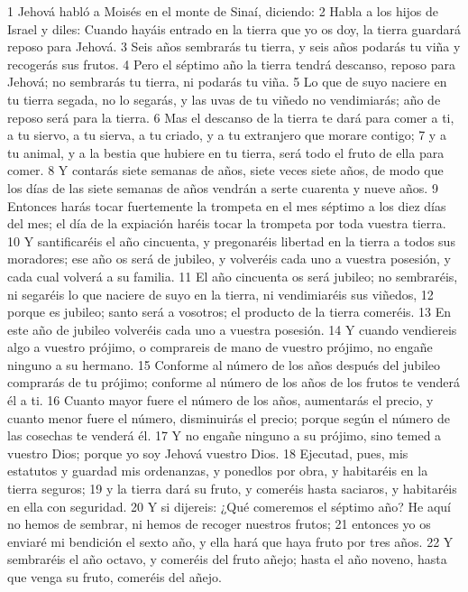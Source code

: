 1 Jehová habló a Moisés en el monte de Sinaí, diciendo:
2 Habla a los hijos de Israel y diles: Cuando hayáis entrado en la tierra que yo os doy, la tierra guardará reposo para Jehová.
3 Seis años sembrarás tu tierra, y seis años podarás tu viña y recogerás sus frutos.
4 Pero el séptimo año la tierra tendrá descanso, reposo para Jehová; no sembrarás tu tierra, ni podarás tu viña.
5 Lo que de suyo naciere en tu tierra segada, no lo segarás, y las uvas de tu viñedo no vendimiarás; año de reposo será para la tierra.
6 Mas el descanso de la tierra te dará para comer a ti, a tu siervo, a tu sierva, a tu criado, y a tu extranjero que morare contigo;
7 y a tu animal, y a la bestia que hubiere en tu tierra, será todo el fruto de ella para comer.
8 Y contarás siete semanas de años, siete veces siete años, de modo que los días de las siete semanas de años vendrán a serte cuarenta y nueve años.
9 Entonces harás tocar fuertemente la trompeta en el mes séptimo a los diez días del mes; el día de la expiación haréis tocar la trompeta por toda vuestra tierra.
10 Y santificaréis el año cincuenta, y pregonaréis libertad en la tierra a todos sus moradores; ese año os será de jubileo, y volveréis cada uno a vuestra posesión, y cada cual volverá a su familia.
11 El año cincuenta os será jubileo; no sembraréis, ni segaréis lo que naciere de suyo en la tierra, ni vendimiaréis sus viñedos,
12 porque es jubileo; santo será a vosotros; el producto de la tierra comeréis.
13 En este año de jubileo volveréis cada uno a vuestra posesión.
14 Y cuando vendiereis algo a vuestro prójimo, o comprareis de mano de vuestro prójimo, no engañe ninguno a su hermano.
15 Conforme al número de los años después del jubileo comprarás de tu prójimo; conforme al número de los años de los frutos te venderá él a ti.
16 Cuanto mayor fuere el número de los años, aumentarás el precio, y cuanto menor fuere el número, disminuirás el precio; porque según el número de las cosechas te venderá él.
17 Y no engañe ninguno a su prójimo, sino temed a vuestro Dios; porque yo soy Jehová vuestro Dios.
18 Ejecutad, pues, mis estatutos y guardad mis ordenanzas, y ponedlos por obra, y habitaréis en la tierra seguros;
19 y la tierra dará su fruto, y comeréis hasta saciaros, y habitaréis en ella con seguridad.
20 Y si dijereis: ¿Qué comeremos el séptimo año? He aquí no hemos de sembrar, ni hemos de recoger nuestros frutos;
21 entonces yo os enviaré mi bendición el sexto año, y ella hará que haya fruto por tres años.
22 Y sembraréis el año octavo, y comeréis del fruto añejo; hasta el año noveno, hasta que venga su fruto, comeréis del añejo.
